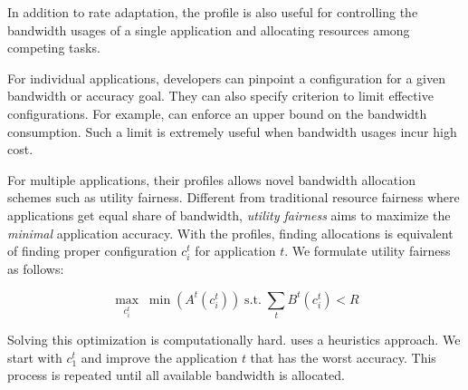 %     

 In addition to rate adaptation, the
profile is also useful for controlling the bandwidth usages of a single
application and allocating resources among competing tasks.

For individual applications, developers can pinpoint a configuration for a given
bandwidth or accuracy goal. They can also specify criterion to limit effective
configurations. For example, \sysname{} can enforce an upper bound on the
bandwidth consumption. Such a limit is extremely useful when bandwidth usages
incur high cost.

For multiple applications, their profiles allows novel bandwidth allocation
schemes such as utility fairness. Different from traditional resource fairness
where applications get equal share of bandwidth, \textit{utility fairness} aims
to maximize the \textit{minimal} application accuracy. With the profiles,
finding allocations is equivalent of finding proper configuration $c_i^t$ for
application $t$. We formulate utility fairness as follows:

\begin{equation}
  \label{eq:multitask}
    \underset{c_i^t}{\max} \; \min({A^t(c_i^t)})
    \;
    \text{s.t.}
    \;
    \sum_t{B^t(c_i^t)} < R
\end{equation}

Solving this optimization is computationally hard. \sysname{} uses a heuristics
approach. We start with $c_1^t$ and improve the application $t$ that has the
worst accuracy. This process is repeated until all available bandwidth is
allocated.

